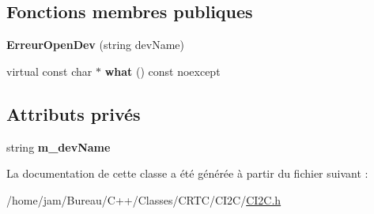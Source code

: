 \subsection*{Fonctions membres publiques}
\begin{DoxyCompactItemize}
\item 
\hypertarget{classCI2C_1_1ErreurOpenDev_ac741480179a06b9d23f4c5c49500a5e1}{{\bfseries Erreur\+Open\+Dev} (string dev\+Name)}\label{classCI2C_1_1ErreurOpenDev_ac741480179a06b9d23f4c5c49500a5e1}

\item 
\hypertarget{classCI2C_1_1ErreurOpenDev_a52441e7b0de2a74dd51c67504bb93fe1}{virtual const char $\ast$ {\bfseries what} () const noexcept}\label{classCI2C_1_1ErreurOpenDev_a52441e7b0de2a74dd51c67504bb93fe1}

\end{DoxyCompactItemize}
\subsection*{Attributs privés}
\begin{DoxyCompactItemize}
\item 
\hypertarget{classCI2C_1_1ErreurOpenDev_a19fcf1034384789940c900e32953e857}{string {\bfseries m\+\_\+dev\+Name}}\label{classCI2C_1_1ErreurOpenDev_a19fcf1034384789940c900e32953e857}

\end{DoxyCompactItemize}


La documentation de cette classe a été générée à partir du fichier suivant \+:\begin{DoxyCompactItemize}
\item 
/home/jam/\+Bureau/\+C++/\+Classes/\+C\+R\+T\+C/\+C\+I2\+C/\hyperlink{CI2C_8h}{C\+I2\+C.\+h}\end{DoxyCompactItemize}
